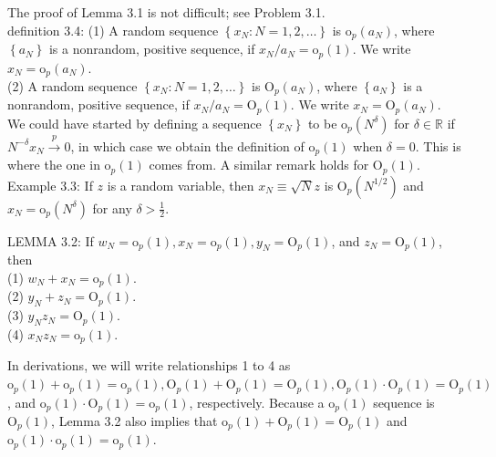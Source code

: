 \documentclass[10pt]{article}
\begin{document}
The proof of Lemma 3.1 is not difficult; see Problem 3.1.\\
definition 3.4: (1) A random sequence $\left\{x_{N}: N=1,2, \ldots\right\}$ is $\mathrm{o}_{p}\left(a_{N}\right)$, where $\left\{a_{N}\right\}$ is a nonrandom, positive sequence, if $x_{N} / a_{N}=\mathrm{o}_{p}(1)$. We write $x_{N}=\mathrm{o}_{p}\left(a_{N}\right)$.\\
(2) A random sequence $\left\{x_{N}: N=1,2, \ldots\right\}$ is $\mathrm{O}_{p}\left(a_{N}\right)$, where $\left\{a_{N}\right\}$ is a nonrandom, positive sequence, if $x_{N} / a_{N}=\mathrm{O}_{p}(1)$. We write $x_{N}=\mathrm{O}_{p}\left(a_{N}\right)$.\\
We could have started by defining a sequence $\left\{x_{N}\right\}$ to be $\mathrm{o}_{p}\left(N^{\delta}\right)$ for $\delta \in \mathbb{R}$ if $N^{-\delta} x_{N} \xrightarrow{p} 0$, in which case we obtain the definition of $\mathrm{o}_{p}(1)$ when $\delta=0$. This is where the one in $\mathrm{o}_{p}(1)$ comes from. A similar remark holds for $\mathrm{O}_{p}(1)$.\\
Example 3.3: If $z$ is a random variable, then $x_{N} \equiv \sqrt{N} z$ is $\mathrm{O}_{p}\left(N^{1 / 2}\right)$ and $x_{N}= \mathrm{o}_{p}\left(N^{\delta}\right)$ for any $\delta>\frac{1}{2}$.

LEMMA 3.2: If $w_{N}=\mathrm{o}_{p}(1), x_{N}=\mathrm{o}_{p}(1), y_{N}=\mathrm{O}_{p}(1)$, and $z_{N}=\mathrm{O}_{p}(1)$, then\\
(1) $w_{N}+x_{N}=\mathrm{o}_{p}(1)$.\\
(2) $y_{N}+z_{N}=\mathrm{O}_{p}(1)$.\\
(3) $y_{N} z_{N}=\mathrm{O}_{p}(1)$.\\
(4) $x_{N} z_{N}=\mathrm{o}_{p}(1)$.

In derivations, we will write relationships 1 to 4 as $\mathrm{o}_{p}(1)+\mathrm{o}_{p}(1)=\mathrm{o}_{p}(1), \mathrm{O}_{p}(1)+ \mathrm{O}_{p}(1)=\mathrm{O}_{p}(1), \mathrm{O}_{p}(1) \cdot \mathrm{O}_{p}(1)=\mathrm{O}_{p}(1)$, and $\mathrm{o}_{p}(1) \cdot \mathrm{O}_{p}(1)=\mathrm{o}_{p}(1)$, respectively. Because a $\mathrm{o}_{p}(1)$ sequence is $\mathrm{O}_{p}(1)$, Lemma 3.2 also implies that $\mathrm{o}_{p}(1)+\mathrm{O}_{p}(1)=\mathrm{O}_{p}(1)$ and $\mathrm{o}_{p}(1) \cdot \mathrm{o}_{p}(1)=\mathrm{o}_{p}(1)$.
\end{document}
